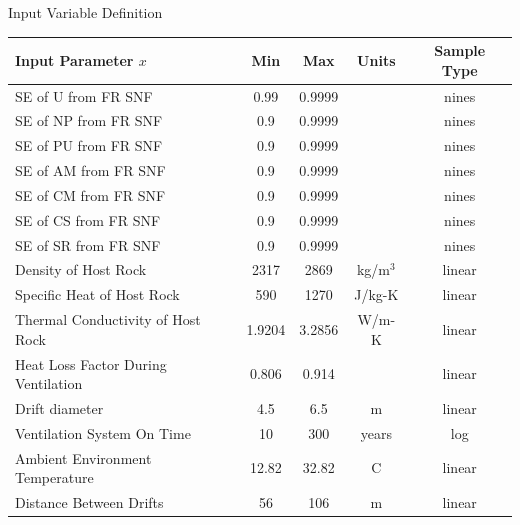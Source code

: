 \documentclass[pdf, autumn, slideColor, nocolorBG]{prosper}
\newcommand{\superscript}[1]{\ensuremath{^{\textrm{#1}}}}
\begin{document}
\begin{slide}{Input Variable Definition}
\tiny
\begin{center}
\begin{tabular}{|l||c|c|c|c|}
\hline
\textbf{Input Parameter $x$} & \textbf{Min} & \textbf{Max} & \textbf{Units} & \textbf{Sample Type}\\
\hline
SE of U from FR SNF & 0.99 & 0.9999 & & nines \\
\hline
SE of NP from FR SNF & 0.9 & 0.9999 & & nines \\
\hline
SE of PU from FR SNF & 0.9 & 0.9999 & & nines \\
\hline
SE of AM from FR SNF & 0.9 & 0.9999 & & nines \\
\hline
SE of CM from FR SNF & 0.9 & 0.9999 & & nines \\
\hline
SE of CS from FR SNF & 0.9 & 0.9999 & & nines \\
\hline
SE of SR from FR SNF & 0.9 & 0.9999 & & nines \\
\hline
Density of Host Rock & 2317 & 2869 & kg/m\superscript{3} & linear \\
\hline
Specific Heat of Host Rock & 590 & 1270 & J/kg-K & linear \\
\hline
Thermal Conductivity of Host Rock & 1.9204 & 3.2856 & W/m-K & linear \\
\hline
Heat Loss Factor During Ventilation  & 0.806 & 0.914 & & linear \\
\hline
Drift diameter & 4.5 & 6.5 & m & linear \\
\hline
Ventilation System On Time & 10 & 300 & years & log \\
\hline
Ambient Environment Temperature & 12.82 & 32.82 & C & linear \\
\hline
Distance Between Drifts & 56 & 106 & m & linear \\
\hline
\end{tabular}
\end{center}
\end{slide}
\end{document}

